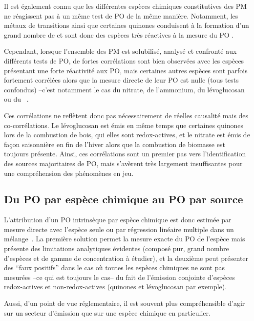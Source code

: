 Il est également connu que les différentes espèces chimiques constitutives des PM ne
réagissent pas à un même test de PO de la même manière. Notamment, les métaux de
transitions ainsi que certaines quinones conduisent à la formation d'un grand nombre de
 et sont donc des espèces très réactives à la mesure du PO
\autocite{charrierRates2015,calasImportance2017}.

Cependant, lorsque l'ensemble des PM est solubilisé, analysé et confronté aux différents
tests de PO, de fortes corrélations sont bien observées avec les espèces présentant une
forte réactivité aux PO, mais certaines autres espèces sont parfois fortement corrélées
alors que la mesure directe de leur PO est nulle (tous tests confondus) --c'est notamment
le cas du nitrate, de l'ammonium, du lévoglucosan ou du
~\autocite{vermaRedox2009,calasComparison2018,calasSeasonal2019}.

Ces corrélations ne reflètent donc pas nécessairement de réelles causalité mais des
co-corrélations. Le lévoglucosan est émis en même temps que certaines quinones lors de la
combustion de bois, qui elles sont redox-actives, et le nitrate est émis de façon
saisonnière en fin de l'hiver alors que la combustion de biomasse est toujours présente.
Ainsi, ces corrélations sont un premier pas vers l'identification des sources majoritaires
de PO, mais s'avèrent très largement insuffisantes pour une compréhension des phénomènes
en jeu.

\subsection{Du PO par espèce chimique au PO par source}

L'attribution d'un PO intrinsèque par espèce chimique est donc estimée par mesure
directe avec l'espèce seule ou par régression linéaire
multiple dans un mélange~\autocite{calasImportance2017,borlazaOxidative2018}. La première solution permet
la mesure exacte du PO de l'espèce mais présente des limitations analytiques évidentes
(composé pur, grand nombre d'espèces et de gamme de concentration à étudier), et la
deuxième peut présenter des ``faux positifs'' dans le cas où toutes les espèces chimiques
ne sont pas mesurées --ce qui est toujours le cas-- du fait de l'émission conjointe
d'espèces redox-actives et non-redox-actives (quinones et lévoglucosan par exemple).

Aussi, d'un point de vue réglementaire, il est souvent plus compréhensible d'agir sur
un secteur d'émission que sur une espèce chimique en particulier.

